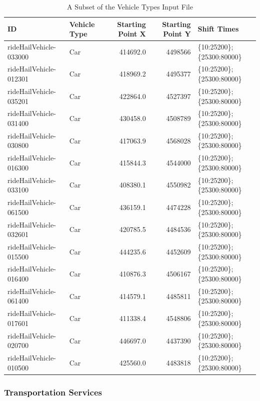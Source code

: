 \documentclass[12pt, oneside, openright]{byuthesis}
\begin{document}
\begin{table}

\caption{\label{tab:rhveh}A Subset of the Vehicle Types Input File}
\centering
\begin{tabular}[t]{llrrl}
\toprule
ID & Vehicle Type & Starting Point X & Starting Point Y & Shift Times\\
\midrule
rideHailVehicle-033000 & Car & 414692.0 & 4498566 & \{10:25200\};\{25300:80000\}\\
rideHailVehicle-012301 & Car & 418969.2 & 4495377 & \{10:25200\};\{25300:80000\}\\
rideHailVehicle-035201 & Car & 422864.0 & 4527397 & \{10:25200\};\{25300:80000\}\\
rideHailVehicle-031400 & Car & 430458.0 & 4508789 & \{10:25200\};\{25300:80000\}\\
rideHailVehicle-030800 & Car & 417063.9 & 4568028 & \{10:25200\};\{25300:80000\}\\
\addlinespace
rideHailVehicle-016300 & Car & 415844.3 & 4544000 & \{10:25200\};\{25300:80000\}\\
rideHailVehicle-033100 & Car & 408380.1 & 4550982 & \{10:25200\};\{25300:80000\}\\
rideHailVehicle-061500 & Car & 436159.1 & 4474228 & \{10:25200\};\{25300:80000\}\\
rideHailVehicle-032601 & Car & 420785.5 & 4484536 & \{10:25200\};\{25300:80000\}\\
rideHailVehicle-015500 & Car & 444235.6 & 4452609 & \{10:25200\};\{25300:80000\}\\
\addlinespace
rideHailVehicle-016400 & Car & 410876.3 & 4506167 & \{10:25200\};\{25300:80000\}\\
rideHailVehicle-061400 & Car & 414579.1 & 4485811 & \{10:25200\};\{25300:80000\}\\
rideHailVehicle-017601 & Car & 411338.4 & 4548806 & \{10:25200\};\{25300:80000\}\\
rideHailVehicle-020700 & Car & 446697.0 & 4437390 & \{10:25200\};\{25300:80000\}\\
rideHailVehicle-010500 & Car & 425560.0 & 4483818 & \{10:25200\};\{25300:80000\}\\
\bottomrule
\end{tabular}
\end{table}

\hypertarget{transportation-services}{%
\subsubsection{Transportation Services}\label{transportation-services}}
\end{document}
